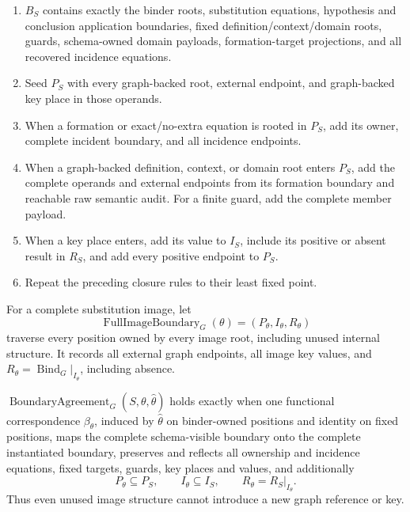 \documentclass[11pt,twoside]{article}
\begin{document}
\begin{enumerate}[leftmargin=2.2em]
  \item \(B_S\) contains exactly the binder roots, substitution equations,
        hypothesis and conclusion application boundaries, fixed
        definition/context/domain roots, guards, schema-owned domain payloads,
        formation-target projections, and all recovered incidence equations.
  \item Seed \(P_S\) with every graph-backed root, external endpoint, and
        graph-backed key place in those operands.
  \item When a formation or exact/no-extra equation is rooted in \(P_S\), add its
        owner, complete incident boundary, and all incidence endpoints.
  \item When a graph-backed definition, context, or domain root enters \(P_S\),
        add the complete operands and external endpoints from its formation
        boundary and reachable raw semantic audit.  For a finite guard, add the
        complete member payload.
  \item When a key place enters, add its value to \(I_S\), include its positive or
        absent result in \(R_S\), and add every positive endpoint to \(P_S\).
  \item Repeat the preceding closure rules to their least fixed point.
\end{enumerate}

For a complete substitution image, let
\[
  \operatorname{FullImageBoundary}_G(\theta)
    =(P_\theta,I_\theta,R_\theta)
\]
traverse every position owned by every image root, including unused internal
structure.  It records all external graph endpoints, all image key values, and
\(R_\theta=\operatorname{Bind}_G|_{I_\theta}\), including absence.

\(\operatorname{BoundaryAgreement}_G(S,\theta,\widehat\theta)\) holds exactly when
one functional correspondence \(\beta_\theta\), induced by
\(\widehat\theta\) on binder-owned positions and identity on fixed positions, maps
the complete schema-visible boundary onto the complete instantiated boundary,
preserves and reflects all ownership and incidence equations, fixed targets,
guards, key places and values, and additionally
\[
  P_\theta\subseteq P_S,\qquad
  I_\theta\subseteq I_S,\qquad
  R_\theta=R_S|_{I_\theta}.
\]
Thus even unused image structure cannot introduce a new graph reference or key.
\end{document}
